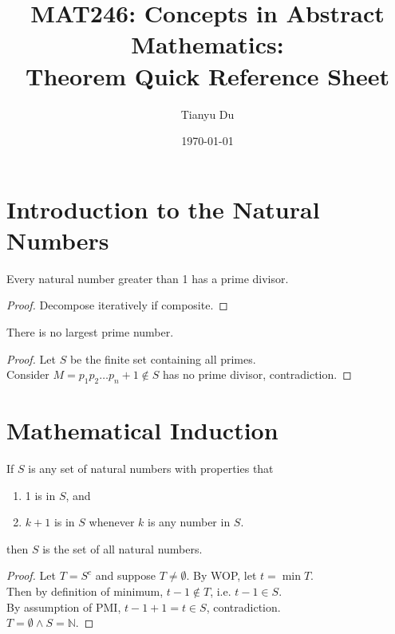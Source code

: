 \documentclass[11pt]{article}
\author{Tianyu Du}
\date{\today}
\title{MAT246: Concepts in Abstract Mathematics: \\ \small Theorem Quick Reference Sheet}
\begin{document}
	\maketitle
	\doclicenseThis
	\tableofcontents
	
	\section{Introduction to the Natural Numbers}
		\begin{lemma}[1.1.1]
			Every natural number greater than 1 has a prime divisor.
		\end{lemma}
		\begin{proof}
			Decompose iteratively if composite.
		\end{proof}
		
		\begin{theorem}[1.1.2]
			There is no largest prime number.
		\end{theorem}
		\begin{proof}
			Let $S$ be the finite set containing all primes. \\
			Consider $M=p_1 p_2 \dots p_n + 1 \notin S$ has no prime divisor, contradiction.
		\end{proof}
	
	\section{Mathematical Induction}
		\begin{theorem}
			If $S$ is any set of natural numbers with properties that
			\begin{enumerate}
				\item 1 is in $S$, and
				\item $k+1$ is in $S$ whenever $k$ is any number in $S$.
			\end{enumerate}
			then $S$ is the set of all natural numbers.
		\end{theorem}
		\begin{proof}
			Let $T = S^c$ and suppose $T \neq \emptyset$. By WOP, let $t = \min T$. \\
			Then by definition of minimum, $t - 1 \notin T$, i.e. $t - 1 \in S$. \\
			By assumption of PMI, $t-1+1=t \in S$, contradiction. \\
			$T = \emptyset \land S = \mathbb{N}$.
		\end{proof}
		
\end{document}
